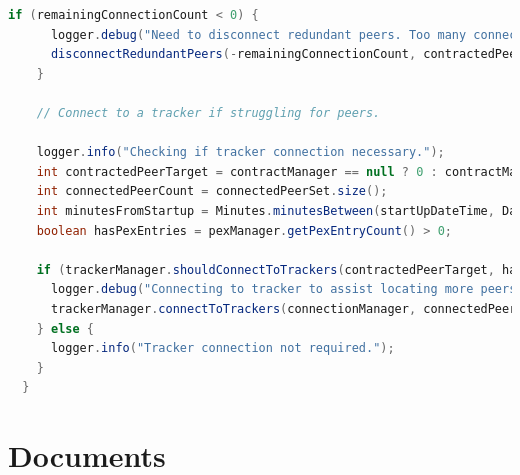 \documentclass[11pt, a4paper, twoside]{report}
\begin{document}
\begin{lstlisting}[language=Java, caption=Peer Population Control, label=lst:peerPop]
    if (remainingConnectionCount < 0) {
      logger.debug("Need to disconnect redundant peers. Too many connections.");
      disconnectRedundantPeers(-remainingConnectionCount, contractedPeers, connectedPeerSet);
    }

    // Connect to a tracker if struggling for peers.

    logger.info("Checking if tracker connection necessary.");
    int contractedPeerTarget = contractManager == null ? 0 : contractManager.getContractCountTarget();
    int connectedPeerCount = connectedPeerSet.size();
    int minutesFromStartup = Minutes.minutesBetween(startUpDateTime, DateTime.now()).getMinutes();
    boolean hasPexEntries = pexManager.getPexEntryCount() > 0;

    if (trackerManager.shouldConnectToTrackers(contractedPeerTarget, hasPexEntries, minutesFromStartup, connectedPeerCount)) {
      logger.debug("Connecting to tracker to assist locating more peers.");
      trackerManager.connectToTrackers(connectionManager, connectedPeers);
    } else {
      logger.info("Tracker connection not required.");
    }
  }
\end{lstlisting}

\section{Documents}
\end{document}
